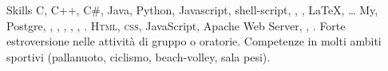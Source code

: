 
\begin{rubric}{Skills}
	C, C++, C\#, Java, Python, Javascript, shell-script, , , \LaTeX, \ldots
\entry*[Databases]
	My, Postgre, , , , , , .
	\textsc{Html, css}, JavaScript, Apache Web Server,  , .
\entry*[Teamwork]
    Forte estroversione nelle attività di gruppo o oratorie.
\entry*[Sport]
    Competenze in molti ambiti sportivi (pallanuoto, ciclismo, beach-volley, sala pesi).
\end{rubric}

